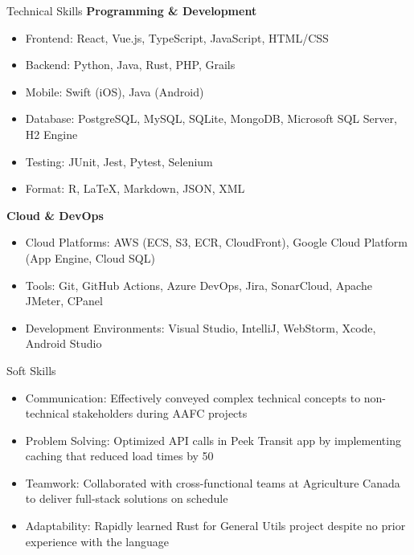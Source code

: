 \documentclass{article}
\newlength{\tabin}
\newlength{\secsep}
\newcommand{\lineunder}{\vspace*{-8pt} \\ \hspace*{-6pt} \hrulefill \\ \vspace*{-15pt}}
\newenvironment{tabbedsection}[1]{
	\begin{list}{}{
		\setlength{\itemsep}{0pt}
		\setlength{\labelsep}{0pt}
		\setlength{\labelwidth}{0pt}
		\setlength{\leftmargin}{\tabin}
		\setlength{\rightmargin}{\tabin}
		\setlength{\listparindent}{0pt}
		\setlength{\parsep}{0pt}
		\setlength{\parskip}{0pt}
		\setlength{\partopsep}{0pt}
		\setlength{\topsep}{#1}
	}
		\item[]
		}{
	\end{list}}
\newenvironment{resume_section}[1]{
	\vspace{2\secsep}
	\textsc{\large#1}
	\lineunder
	\begin{tabbedsection}{\secsep}
	}{\end{tabbedsection}}
\newenvironment{subitems}{
	\renewcommand{\labelitemi}{-}
	\begin{itemize}
		\setlength{\labelsep}{1em}
		}{
	\end{itemize}}
\begin{document}
	\begin{resume_section}{Technical Skills}
		\textbf{Programming \& Development}
		\begin{subitems}
			\item Frontend: React, Vue.js, TypeScript, JavaScript, HTML/CSS
			\item Backend: Python, Java, Rust, PHP, Grails
			\item Mobile: Swift (iOS), Java (Android)
			\item Database: PostgreSQL, MySQL, SQLite, MongoDB, Microsoft SQL Server, H2 Engine
			\item Testing: JUnit, Jest, Pytest, Selenium
			\item Format: R, LaTeX, Markdown, JSON, XML
		\end{subitems}
		\textbf{Cloud \& DevOps}
		\begin{subitems}
			\item Cloud Platforms: AWS (ECS, S3, ECR, CloudFront), Google Cloud Platform (App Engine, Cloud SQL)
			\item Tools: Git, GitHub Actions, Azure DevOps, Jira, SonarCloud, Apache JMeter, CPanel
			\item Development Environments: Visual Studio, IntelliJ, WebStorm, Xcode, Android Studio
		\end{subitems}
	\end{resume_section}
	
	\begin{resume_section}{Soft Skills}
		\begin{subitems}
			\item Communication: Effectively conveyed complex technical concepts to non-technical stakeholders during AAFC projects
			\item Problem Solving: Optimized API calls in Peek Transit app by implementing caching that reduced load times by 50%
			\item Teamwork: Collaborated with cross-functional teams at Agriculture Canada to deliver full-stack solutions on schedule
			\item Adaptability: Rapidly learned Rust for General Utils project despite no prior experience with the language
		\end{subitems}
	\end{resume_section}
	
\end{document}
